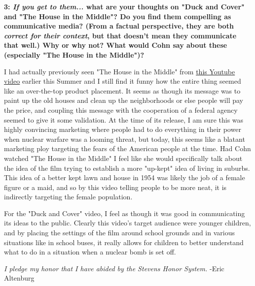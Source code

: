 \documentclass[12pt]{turabian-researchpaper}
\newcommand\question[2]{\noindent\textbf{#1: #2}}
\begin{document}
\question{3}{\textit{If you get to them...} what are your thoughts on "Duck and Cover" and "The House in the Middle"? Do you find them compelling as communicative media? (From a factual perspective, they are both \textit{correct for their context}, but that doesn't mean they communicate that well.) Why or why not? What would Cohn say about these (especially "The House in the Middle")?}

	I had actually previously seen "The House in the Middle" from \href{https://www.youtube.com/watch?v=kn0XEa4B144}{this Youtube video} earlier this Summer and I still find it funny how the entire thing seemed like an over-the-top product placement. It seems as though its message was to paint up the old houses and clean up the neighborhoods or else people will pay the price, and coupling this message with the cooperation of a federal agency seemed to give it some validation. At the time of its release, I am sure this was highly convincing marketing where people had to do everything in their power when nuclear warfare was a looming threat, but today, this seems like a blatant marketing ploy targeting the fears of the American people at the time. Had Cohn watched "The House in the Middle" I feel like she would specifically talk about the idea of the film trying to establish a more "up-kept" idea of living in suburbs. This idea of a better kept lawn and house in 1954 was likely the job of a female figure or a maid, and so by this video telling people to be more neat, it is indirectly targeting the female population.  

	For the "Duck and Cover" video, I feel as though it was good in communicating its ideas to the public. Clearly this video's target audience were younger children, and by placing the settings of the film around school grounds and in various situations like in school buses, it really allows for children to better understand what to do in a situation when a nuclear bomb is set off.

\vspace*{\fill}
\noindent\textit{I pledge my honor that I have abided by the Stevens Honor System.} -Eric Altenburg
\end{document}
